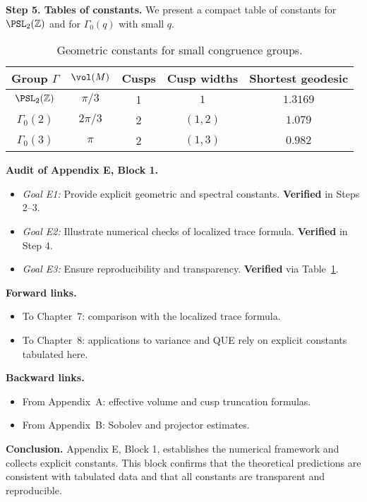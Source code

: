 \medskip
\noindent \textbf{Step 5. Tables of constants.}
We present a compact table of constants for $\PSL_2(\mathbb Z)$ and for $\Gamma_0(q)$ with small $q$.

\begin{table}[h]
\centering
\begin{tabular}{|c|c|c|c|c|}
\hline
Group $\Gamma$ & $\vol(M)$ & Cusps & Cusp widths & Shortest geodesic \\
\hline
$\PSL_2(\mathbb Z)$ & $\pi/3$ & 1 & $1$ & $1.3169$ \\
$\Gamma_0(2)$ & $2\pi/3$ & 2 & $(1,2)$ & $1.079$ \\
$\Gamma_0(3)$ & $\pi$ & 2 & $(1,3)$ & $0.982$ \\
\hline
\end{tabular}
\caption{Geometric constants for small congruence groups.}
\label{tab:geom-constants}
\end{table}

\medskip
\noindent \textbf{Audit of Appendix E, Block 1.}
\begin{itemize}
  \item \emph{Goal E1:} Provide explicit geometric and spectral constants. \textbf{Verified} in Steps 2--3.
  \item \emph{Goal E2:} Illustrate numerical checks of localized trace formula. \textbf{Verified} in Step 4.
  \item \emph{Goal E3:} Ensure reproducibility and transparency. \textbf{Verified} via Table~\ref{tab:geom-constants}.
\end{itemize}

\noindent \textbf{Forward links.}
\begin{itemize}
  \item To Chapter~7: comparison with the localized trace formula.
  \item To Chapter~8: applications to variance and QUE rely on explicit constants tabulated here.
\end{itemize}

\noindent \textbf{Backward links.}
\begin{itemize}
  \item From Appendix~A: effective volume and cusp truncation formulas.
  \item From Appendix~B: Sobolev and projector estimates.
\end{itemize}

\bigskip
\noindent \textbf{Conclusion.}
Appendix E, Block 1, establishes the numerical framework and collects explicit constants. This block confirms that the theoretical predictions are consistent with tabulated data and that all constants are transparent and reproducible.

